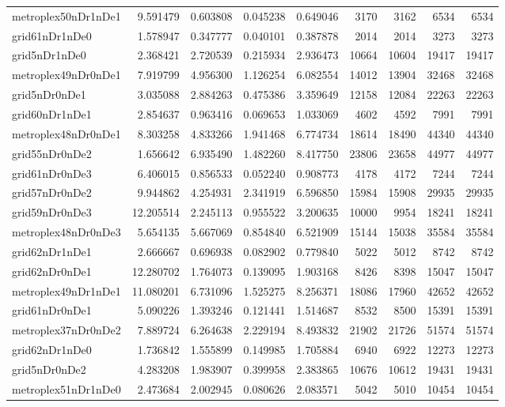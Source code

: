 \begin{longtable}{|l|r|r|r|r|r|r|r|r|}
metroplex50nDr1nDe1 & 9.591479 & 0.603808 & 0.045238 & 0.649046 & 3170 & 3162 & 6534 & 6534 \\
grid61nDr1nDe0 & 1.578947 & 0.347777 & 0.040101 & 0.387878 & 2014 & 2014 & 3273 & 3273 \\
grid5nDr1nDe0 & 2.368421 & 2.720539 & 0.215934 & 2.936473 & 10664 & 10604 & 19417 & 19417 \\
metroplex49nDr0nDe1 & 7.919799 & 4.956300 & 1.126254 & 6.082554 & 14012 & 13904 & 32468 & 32468 \\
grid5nDr0nDe1 & 3.035088 & 2.884263 & 0.475386 & 3.359649 & 12158 & 12084 & 22263 & 22263 \\
grid60nDr1nDe1 & 2.854637 & 0.963416 & 0.069653 & 1.033069 & 4602 & 4592 & 7991 & 7991 \\
metroplex48nDr0nDe1 & 8.303258 & 4.833266 & 1.941468 & 6.774734 & 18614 & 18490 & 44340 & 44340 \\
grid55nDr0nDe2 & 1.656642 & 6.935490 & 1.482260 & 8.417750 & 23806 & 23658 & 44977 & 44977 \\
grid61nDr0nDe3 & 6.406015 & 0.856533 & 0.052240 & 0.908773 & 4178 & 4172 & 7244 & 7244 \\
grid57nDr0nDe2 & 9.944862 & 4.254931 & 2.341919 & 6.596850 & 15984 & 15908 & 29935 & 29935 \\
grid59nDr0nDe3 & 12.205514 & 2.245113 & 0.955522 & 3.200635 & 10000 & 9954 & 18241 & 18241 \\
metroplex48nDr0nDe3 & 5.654135 & 5.667069 & 0.854840 & 6.521909 & 15144 & 15038 & 35584 & 35584 \\
grid62nDr1nDe1 & 2.666667 & 0.696938 & 0.082902 & 0.779840 & 5022 & 5012 & 8742 & 8742 \\
grid62nDr0nDe1 & 12.280702 & 1.764073 & 0.139095 & 1.903168 & 8426 & 8398 & 15047 & 15047 \\
metroplex49nDr1nDe1 & 11.080201 & 6.731096 & 1.525275 & 8.256371 & 18086 & 17960 & 42652 & 42652 \\
grid61nDr0nDe1 & 5.090226 & 1.393246 & 0.121441 & 1.514687 & 8532 & 8500 & 15391 & 15391 \\
metroplex37nDr0nDe2 & 7.889724 & 6.264638 & 2.229194 & 8.493832 & 21902 & 21726 & 51574 & 51574 \\
grid62nDr1nDe0 & 1.736842 & 1.555899 & 0.149985 & 1.705884 & 6940 & 6922 & 12273 & 12273 \\
grid5nDr0nDe2 & 4.283208 & 1.983907 & 0.399958 & 2.383865 & 10676 & 10612 & 19431 & 19431 \\
metroplex51nDr1nDe0 & 2.473684 & 2.002945 & 0.080626 & 2.083571 & 5042 & 5010 & 10454 & 10454 \\

\end{longtable}
